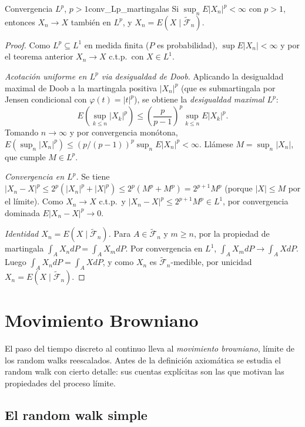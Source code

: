 \documentclass[11pt, a4paper]{article}
\begin{document}
\begin{teorema}{Convergencia $L^p$, $p > 1$}{conv_Lp_martingalas}
Si $\sup_n E|X_n|^p < \infty$ con $p > 1$, entonces $X_n \to X$ también en $L^p$, y
$X_n = E(X \mid \widetilde{\mathcal{F}}_n)$.
\end{teorema}

\begin{proof}
Como $L^p \subseteq L^1$ en medida finita ($P$ es probabilidad), $\sup E|X_n| < \infty$ y por el
teorema anterior $X_n \to X$ c.t.p.\ con $X \in L^1$.

\textit{Acotación uniforme en $L^p$ via desigualdad de Doob.} Aplicando la desigualdad maximal de
Doob a la martingala positiva $|X_n|^p$ (que es submartingala por Jensen condicional con
$\varphi(t) = |t|^p$), se obtiene la \emph{desigualdad maximal $L^p$}:
$$ E\!\left(\sup_{k \le n} |X_k|^p\right) \le \left(\frac{p}{p - 1}\right)^p \sup_{k \le n}
E|X_k|^p. $$
Tomando $n \to \infty$ y por convergencia monótona, $E(\sup_n |X_n|^p) \le (p/(p-1))^p \sup_n
E|X_n|^p < \infty$. Llámese $M = \sup_n |X_n|$, que cumple $M \in L^p$.

\textit{Convergencia en $L^p$.} Se tiene $|X_n - X|^p \le 2^p (|X_n|^p + |X|^p) \le 2^p (M^p + M^p)
= 2^{p+1} M^p$ (porque $|X| \le M$ por el límite). Como $X_n \to X$ c.t.p.\ y $|X_n - X|^p \le
2^{p+1} M^p \in L^1$, por convergencia dominada $E|X_n - X|^p \to 0$.

\textit{Identidad $X_n = E(X \mid \widetilde{\mathcal{F}}_n)$.} Para $A \in
\widetilde{\mathcal{F}}_n$ y $m \ge n$, por la propiedad de martingala $\int_A X_n dP = \int_A X_m
dP$. Por convergencia en $L^1$, $\int_A X_m dP \to \int_A X dP$. Luego $\int_A X_n dP = \int_A X
dP$, y como $X_n$ es $\widetilde{\mathcal{F}}_n$-medible, por unicidad $X_n = E(X \mid
\widetilde{\mathcal{F}}_n)$.
\end{proof}

\newpage

\section{Movimiento Browniano}

El paso del tiempo discreto al continuo lleva al \emph{movimiento browniano}, límite de los
random walks reescalados. Antes de la definición axiomática se estudia el random walk con
cierto detalle: sus cuentas explícitas son las que motivan las propiedades del proceso
límite.

\subsection{El random walk simple}
\end{document}
